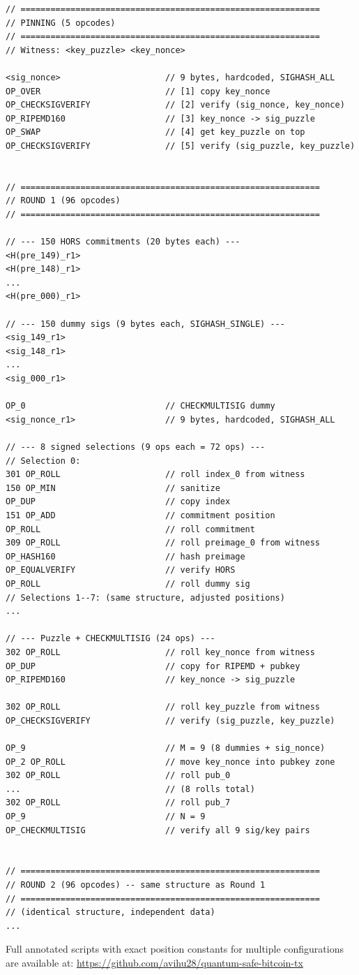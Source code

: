 \documentclass[11pt, a4paper]{article}
\begin{document}
\begin{lstlisting}[language={}, numbers=none]
// ============================================================
// PINNING (5 opcodes)
// ============================================================
// Witness: <key_puzzle> <key_nonce>

<sig_nonce>                     // 9 bytes, hardcoded, SIGHASH_ALL
OP_OVER                         // [1] copy key_nonce
OP_CHECKSIGVERIFY               // [2] verify (sig_nonce, key_nonce)
OP_RIPEMD160                    // [3] key_nonce -> sig_puzzle
OP_SWAP                         // [4] get key_puzzle on top
OP_CHECKSIGVERIFY               // [5] verify (sig_puzzle, key_puzzle)


// ============================================================
// ROUND 1 (96 opcodes)
// ============================================================

// --- 150 HORS commitments (20 bytes each) ---
<H(pre_149)_r1>
<H(pre_148)_r1>
...
<H(pre_000)_r1>

// --- 150 dummy sigs (9 bytes each, SIGHASH_SINGLE) ---
<sig_149_r1>
<sig_148_r1>
...
<sig_000_r1>

OP_0                            // CHECKMULTISIG dummy
<sig_nonce_r1>                  // 9 bytes, hardcoded, SIGHASH_ALL

// --- 8 signed selections (9 ops each = 72 ops) ---
// Selection 0:
301 OP_ROLL                     // roll index_0 from witness
150 OP_MIN                      // sanitize
OP_DUP                          // copy index
151 OP_ADD                      // commitment position
OP_ROLL                         // roll commitment
309 OP_ROLL                     // roll preimage_0 from witness
OP_HASH160                      // hash preimage
OP_EQUALVERIFY                  // verify HORS
OP_ROLL                         // roll dummy sig
// Selections 1--7: (same structure, adjusted positions)
...

// --- Puzzle + CHECKMULTISIG (24 ops) ---
302 OP_ROLL                     // roll key_nonce from witness
OP_DUP                          // copy for RIPEMD + pubkey
OP_RIPEMD160                    // key_nonce -> sig_puzzle

302 OP_ROLL                     // roll key_puzzle from witness
OP_CHECKSIGVERIFY               // verify (sig_puzzle, key_puzzle)

OP_9                            // M = 9 (8 dummies + sig_nonce)
OP_2 OP_ROLL                    // move key_nonce into pubkey zone
302 OP_ROLL                     // roll pub_0
...                             // (8 rolls total)
302 OP_ROLL                     // roll pub_7
OP_9                            // N = 9
OP_CHECKMULTISIG                // verify all 9 sig/key pairs


// ============================================================
// ROUND 2 (96 opcodes) -- same structure as Round 1
// ============================================================
// (identical structure, independent data)
...
\end{lstlisting}

\noindent Full annotated scripts with exact position constants for multiple configurations are available at: \url{https://github.com/avihu28/quantum-safe-bitcoin-tx}
\end{document}
